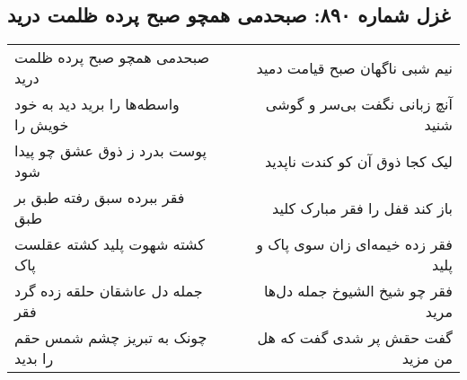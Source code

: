 \begin{center}
\section*{غزل شماره ۸۹۰: صبحدمی همچو صبح پرده ظلمت درید}
\label{sec:0890}
\begin{longtable}{l p{0.5cm} r}
صبحدمی همچو صبح پرده ظلمت درید
&&
نیم شبی ناگهان صبح قیامت دمید
\\
واسطه‌ها را برید دید به خود خویش را
&&
آنچ زبانی نگفت بی‌سر و گوشی شنید
\\
پوست بدرد ز ذوق عشق چو پیدا شود
&&
لیک کجا ذوق آن کو کندت ناپدید
\\
فقر ببرده سبق رفته طبق بر طبق
&&
باز کند قفل را فقر مبارک کلید
\\
کشته شهوت پلید کشته عقلست پاک
&&
فقر زده خیمه‌ای زان سوی پاک و پلید
\\
جمله دل عاشقان حلقه زده گرد فقر
&&
فقر چو شیخ الشیوخ جمله دل‌ها مرید
\\
چونک به تبریز چشم شمس حقم را بدید
&&
گفت حقش پر شدی گفت که هل من مزید
\\
\end{longtable}
\end{center}
